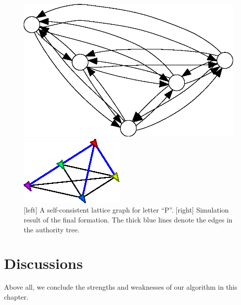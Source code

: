 \begin{figure}
    \centering
  \begin{minipage}[b]{0.45\linewidth}
  \includegraphics[width=.9\columnwidth]{figs/pletter}
  \end{minipage}
   \begin{minipage}[b]{0.45\linewidth}
     \includegraphics[width=.9\columnwidth]{figs/p-formation}
   \end{minipage}
   \caption{[left] A self-consistent lattice graph for letter ``P''. [right]
     Simulation result of the final formation. 
     The thick blue lines denote the edges in the authority tree.}
   \label{fig:p-letter}
 \end{figure}
 

\section{Discussions} 
\label{sec:conc-mrf1}
Above all, we conclude the strengths and weaknesses of our algorithm in this chapter.

